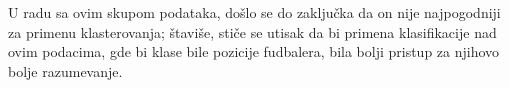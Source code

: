 \documentclass[a4paper]{article}
\begin{document}
U radu sa ovim skupom podataka, došlo se do zaključka da on nije najpogodniji za primenu klasterovanja; štaviše, stiče se utisak da bi primena klasifikacije nad ovim podacima, gde bi klase bile pozicije fudbalera, bila bolji pristup za njihovo bolje razumevanje.

\appendix
 

\end{document}
